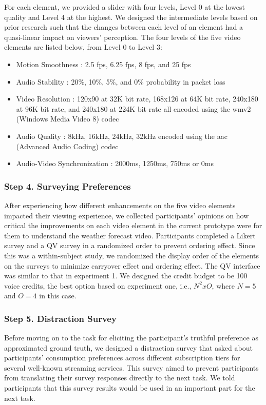For each element, we provided a slider with four levels, Level 0 at the lowest quality and Level 4 at the highest. We designed the intermediate levels based on prior research such that the changes between each level of an element had a quasi-linear impact on viewers' perception. The four levels of the five video elements are listed below, from Level 0 to Level 3:
\begin{itemize}
    \item Motion Smoothness \cite{huynh2008temporal}: 2.5 fps, 6.25 fps, 8 fps, and 25 fps
    \item Audio Stability \cite{hardman1998successful}: 20\%, 10\%, 5\%, and 0\% probability in packet loss
    \item Video Resolution \cite{knoche2005can}: 120x90 at 32K bit rate, 168x126 at 64K bit rate, 240x180 at 96K bit rate, and 240x180 at 224K bit rate all encoded using the wmv2 (Windows Media Video 8) codec 
    \item Audio Quality \cite{knoche2008low, noll1993wideband}: 8kHz, 16kHz, 24kHz, 32kHz encoded using the aac (Advanced Audio Coding) codec
    \item Audio-Video Synchronization \cite{steinmetz1996human}: 2000ms, 1250ms,  750ms or 0ms
\end{itemize}



\subsubsection{Step 4. Surveying Preferences}
After experiencing how different enhancements on the five video elements impacted their viewing experience, we collected participants' opinions on how critical the improvements on each video element in the current prototype were for them to understand the weather forecast video. Participants completed a Likert survey and a QV survey in a randomized order to prevent ordering effect. Since this was a within-subject study, we randomized the display order of the elements on the surveys to minimize carryover effect and ordering effect. The QV interface was similar to that in experiment 1. We designed the credit budget to be 100 voice credits, the best option based on experiment one, i.e., $N^2 x O$, where $N=5$ and $O=4$ in this case.

\subsubsection{Step 5. Distraction Survey}
Before moving on to the task for eliciting the participant's truthful preference as approximated ground truth, we designed a distraction survey that asked about participants' consumption preferences across different subscription tiers for several well-known streaming services. This survey aimed to prevent participants from translating their survey responses directly to the next task. We told participants that this survey results would be used in an important part for the next task.

